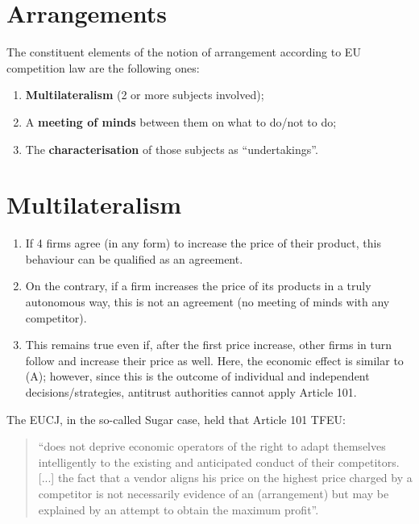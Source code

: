 \section*{Arrangements}

    The constituent elements of the notion of arrangement according to EU competition law are the following ones: 

    \begin{enumerate}
        \item \textbf{Multilateralism} (2 or more subjects involved); 
        \item A \textbf{meeting of minds} between them on what to do/not to do; 
        \item The \textbf{characterisation} of those subjects as “undertakings”.
    \end{enumerate}

    \section{Multilateralism}


        \begin{enumerate}
            \item If 4 firms agree (in any form) to increase the price of their product, this behaviour can be qualified as an agreement.
            \item On the contrary, if a firm increases the price of its products in a truly autonomous way, this is not an agreement (no meeting of minds with any competitor).
            \item This remains true even if, after the first price increase, other firms in turn follow and increase their price as well. Here, the economic effect is similar to (A); however, since this is the outcome of individual and independent decisions/strategies, antitrust authorities cannot apply Article 101.
        \end{enumerate}

        The EUCJ, in the so-called Sugar case, held that Article 101 TFEU: 

        \begin{quote}
            “does not deprive economic operators of the right to adapt themselves intelligently to the existing and anticipated conduct of their competitors. [...] the fact that a vendor aligns his price on the highest price charged by a competitor is not necessarily evidence of an (arrangement) but may be explained by an attempt to obtain the maximum profit”.
        \end{quote}

